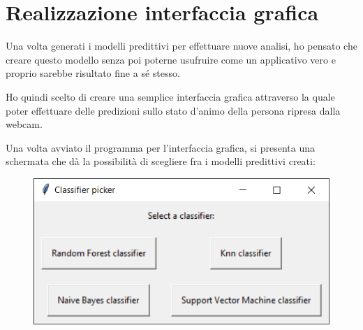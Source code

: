 \chapter{Realizzazione interfaccia grafica}
Una volta generati i modelli predittivi per effettuare nuove analisi, ho pensato che creare questo modello senza poi poterne usufruire come un applicativo vero e proprio sarebbe risultato fine a sé stesso.

Ho quindi scelto di creare una semplice interfaccia grafica attraverso la quale poter effettuare delle predizioni sullo stato d’animo della persona ripresa dalla webcam.

Una volta avviato il programma per l’interfaccia grafica, si presenta una schermata che dà la possibilità di scegliere fra i modelli predittivi creati:

\begin{figure}
    \begin{center}    
        \includegraphics[width=0.9\linewidth]{images/image51.png}
    \end{center}
\end{figure}

